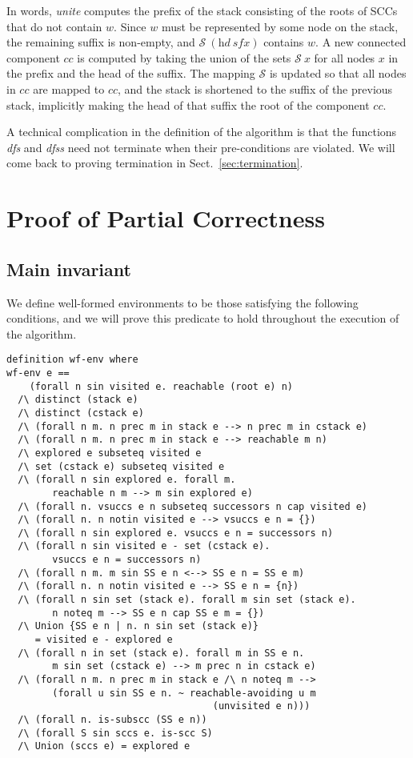 \documentclass[sigplan,10pt,anonymous,review]{acmart}
\newcommand{\prog}[1]{\textit{#1}}
\renewcommand{\SS}{\mathcal{S}}
\begin{document}
In words, \prog{unite} computes the prefix of the stack consisting of the roots of SCCs that do not contain $w$. Since $w$ must be represented by some node on the stack, the remaining suffix is non-empty, and $\SS~(\prog{hd}~\prog{sfx})$ contains $w$. A new connected component $\prog{cc}$ is computed by taking the union of the sets $\SS~x$ for all nodes $x$ in the prefix and the head of the suffix. The mapping $\SS$ is updated so that all nodes in $\prog{cc}$ are mapped to $\prog{cc}$, and the stack is shortened to the suffix of the previous stack, implicitly making the head of that suffix the root of the component $cc$.

A technical complication in the definition of the algorithm is that the functions \prog{dfs} and \prog{dfss} need not terminate when their pre-conditions are violated. We will come back to proving termination in Sect.~\ref{sec:termination}.


\section{Proof of Partial Correctness}
\label{sec:partial-correctness}

\subsection{Main invariant}
\label{sec:invariant}

We define well-formed environments to be those satisfying the following conditions, and we will prove this predicate to hold throughout the execution of the algorithm.

\begin{small}
\begin{lstlisting}[language=isabelle]
definition wf-env where
wf-env e ==
    (forall n sin visited e. reachable (root e) n)
  /\ distinct (stack e)
  /\ distinct (cstack e)
  /\ (forall n m. n prec m in stack e --> n prec m in cstack e)
  /\ (forall n m. n prec m in stack e --> reachable m n)
  /\ explored e subseteq visited e
  /\ set (cstack e) subseteq visited e
  /\ (forall n sin explored e. forall m. 
        reachable n m --> m sin explored e)
  /\ (forall n. vsuccs e n subseteq successors n cap visited e)
  /\ (forall n. n notin visited e --> vsuccs e n = {})
  /\ (forall n sin explored e. vsuccs e n = successors n)
  /\ (forall n sin visited e - set (cstack e). 
        vsuccs e n = successors n)
  /\ (forall n m. m sin SS e n <--> SS e n = SS e m)
  /\ (forall n. n notin visited e --> SS e n = {n})
  /\ (forall n sin set (stack e). forall m sin set (stack e).
        n noteq m --> SS e n cap SS e m = {})
  /\ Union {SS e n | n. n sin set (stack e)} 
     = visited e - explored e
  /\ (forall n in set (stack e). forall m in SS e n.
        m sin set (cstack e) --> m prec n in cstack e)
  /\ (forall n m. n prec m in stack e /\ n noteq m -->
        (forall u sin SS e n. ~ reachable-avoiding u m 
                                    (unvisited e n)))
  /\ (forall n. is-subscc (SS e n))
  /\ (forall S sin sccs e. is-scc S)
  /\ Union (sccs e) = explored e
\end{lstlisting}
\end{small}
\end{document}
